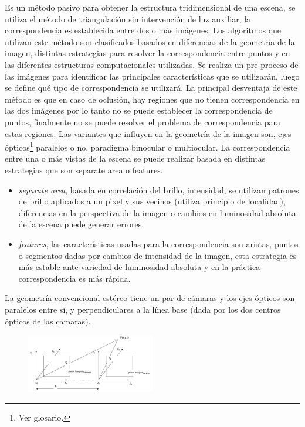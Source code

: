 Es un método pasivo para obtener la estructura tridimensional de una escena, se utiliza el método de triangulación sin intervención de luz auxiliar, la correspondencia es establecida entre dos o más imágenes.
Los algoritmos que utilizan este método son clasificados basados en diferencias de la geometría de la imagen, distintas estrategias para resolver la correspondencia entre puntos y en las diferentes estructuras computacionales utilizadas\cite{StereoReview}.
Se realiza un pre proceso de las imágenes para identificar las principales características que se utilizarán, luego se define qué tipo de correspondencia se utilizará.
La principal desventaja de este método es que en caso de oclusión, hay regiones que no tienen correspondencia en las dos imágenes por lo tanto no se puede establecer la correspondencia de puntos, finalmente no se puede resolver el problema de correspondencia para estas regiones.
Las variantes que influyen en la geometría de la imagen son, ejes ópticos\footnote{Ver glosario.} paralelos o no, paradigma binocular o multiocular.
La correspondencia entre una o más vistas de la escena se puede realizar basada en distintas estrategias que son separate area o features.
\begin{itemize}
   \item \emph{separate area}, basada en correlación del brillo, intensidad, se utilizan patrones de brillo aplicados a un pixel y sus vecinos (utiliza principio de localidad), diferencias en la perspectiva de la imagen o cambios en luminosidad absoluta de la escena puede generar errores.
   \item \emph{features}, las características usadas para la correspondencia son aristas, puntos o segmentos dadas por cambios de intensidad de la imagen, esta estrategia es más estable  ante variedad de luminosidad absoluta y en la práctica correspondencia es más rápida.
\end{itemize}
La geometría convencional estéreo tiene un par de cámaras y los ejes ópticos son paralelos entre sí, y perpendiculares a la línea base (dada por los dos centros ópticos de las cámaras).

\begin{figure}[H]
  \centering
    \includegraphics[width=0.5\textwidth]{./Cap6_reconstruccion/stereo.PNG}
  \caption{}
  \label{fig:Stereo}
\end{figure}

